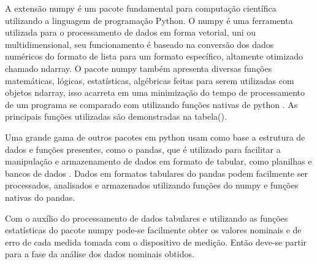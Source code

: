 A extensão numpy é um pacote fundamental para computação científica utilizando a linguagem de programação Python. O numpy é uma ferramenta utilizada para o processamento de dados em forma vetorial, uni ou multidimensional, seu funcionamento é baseado na conversão dos dados numéricos do formato de lista para um formato específico, altamente otimizado chamado ndarray. O pacote numpy também apresenta diversas funções matemáticas, lógicas, estatísticas, algébricas feitas para serem utilizadas com objetos ndarray, isso acarreta em uma minimização do tempo de processamento de um programa se comparado com utilizando funções nativas de python \autocite{DocsPandas}. As principais funções utilizadas são demonstradas na tabela().

\begin{table}[htb]
\caption[Funções do pacote NumPy utilizadas]{Funções utilizadas}
\label{tab-nivinv}
\end{table}

Uma grande gama de outros pacotes em python usam como base a estrutura de dados e funções presentes, como o pandas, que é utilizado para facilitar a manipulação e armazenamento de dados em formato de tabular, como planilhas e bancos de dados \autocite{DocsPandas}. Dados em formatos tabulares do pandas podem facilmente ser processados, analisados e armazenados utilizando funções do numpy e funções nativas do pandas.

Com o auxílio do processamento de dados tabulares e utilizando as funções estatísticas do pacote numpy pode-se facilmente obter os valores nominais e de erro de cada medida tomada com o dispositivo de medição. Então deve-se partir para a fase da análise dos dados nominais obtidos.

